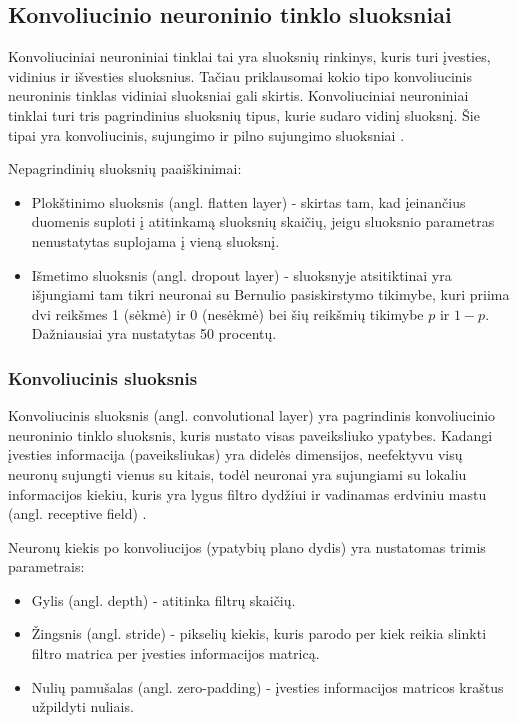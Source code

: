 \documentclass{VUMIFPSkursinis}
\begin{document}
\subsection{Konvoliucinio neuroninio tinklo sluoksniai}
Konvoliuciniai neuroniniai tinklai tai yra sluoksnių rinkinys, kuris turi įvesties, vidinius ir išvesties sluoksnius. Tačiau priklausomai 
kokio tipo konvoliucinis neuroninis tinklas vidiniai sluoksniai gali skirtis. Konvoliuciniai neuroniniai tinklai turi tris pagrindinius 
sluoksnių tipus, kurie sudaro vidinį sluoksnį. Šie tipai yra konvoliucinis, sujungimo ir pilno sujungimo sluoksniai \cite{CNNbasic}.

Nepagrindinių sluoksnių paaiškinimai:
\begin{itemize}
\item Plokštinimo sluoksnis (angl. flatten layer) - skirtas tam, kad įeinančius duomenis suploti į atitinkamą sluoksnių skaičių, jeigu sluoksnio parametras nenustatytas suplojama į vieną sluoksnį.
\item Išmetimo sluoksnis (angl. dropout layer) - sluoksnyje atsitiktinai yra išjungiami tam tikri neuronai su Bernulio pasiskirstymo tikimybe, kuri priima dvi reikšmes 1 (sėkmė) ir 0 (nesėkmė) 
bei šių reikšmių tikimybe \(p\) ir \(1 - p\). Dažniausiai yra nustatytas 50 procentų.
\end{itemize}

\subsubsection{Konvoliucinis sluoksnis}
Konvoliucinis sluoksnis (angl. convolutional layer) yra pagrindinis konvoliucinio neuroninio tinklo sluoksnis, kuris nustato visas paveiksliuko ypatybes.
Kadangi įvesties informacija (paveiksliukas) yra didelės dimensijos, neefektyvu visų neuronų sujungti vienus su kitais, todėl neuronai yra sujungiami
su lokaliu informacijos kiekiu, kuris yra lygus filtro dydžiui ir vadinamas erdviniu mastu (angl. receptive field) \cite{layers-CS231n}.

Neuronų kiekis po konvoliucijos (ypatybių plano dydis) yra nustatomas trimis parametrais:
\begin{itemize}
\item Gylis (angl. depth) - atitinka filtrų skaičių.
\item Žingsnis (angl. stride) - pikselių kiekis, kuris parodo per kiek reikia slinkti filtro matrica per įvesties informacijos matricą.
\item Nulių pamušalas (angl. zero-padding) - įvesties informacijos matricos kraštus užpildyti nuliais.
\end{itemize}
\end{document}
